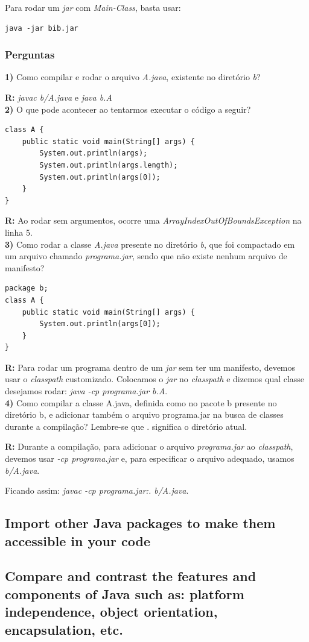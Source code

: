 \documentclass[12pt]{article}
\begin{document}
Para rodar um \textit{jar} com \textit{Main-Class}, basta usar:

\begin{lstlisting}
java -jar bib.jar
\end{lstlisting}

\subsubsection{Perguntas}

\textbf{1)} Como compilar e rodar o arquivo \textit{A.java}, existente no diretório \textit{b}?

\textbf{R:} \textit{javac b/A.java} e \textit{java b.A}
\\

\textbf{2)} O que pode acontecer ao tentarmos executar o código a seguir?

\begin{lstlisting}
class A {
	public static void main(String[] args) {
		System.out.println(args);
		System.out.println(args.length);
		System.out.println(args[0]);
	}
}
\end{lstlisting}

\textbf{R:} Ao rodar sem argumentos, ocorre uma \textit{ArrayIndexOutOfBoundsException} na linha 5.
\\

\textbf{3)} Como rodar a classe \textit{A.java} presente no diretório \textit{b}, que foi compactado em um arquivo chamado \textit{programa.jar}, sendo que não existe nenhum arquivo de manifesto?

\begin{lstlisting}
package b;
class A {
	public static void main(String[] args) {
		System.out.println(args[0]);
	}
}
\end{lstlisting}

\textbf{R:} Para rodar um programa dentro de um \textit{jar} sem ter um manifesto, devemos usar o \textit{classpath} customizado. Colocamos o \textit{jar} no \textit{classpath} e dizemos qual classe desejamos rodar: \textit{java -cp programa.jar b.A}.
\\

\textbf{4)} Como compilar a classe A.java, definida como no pacote b presente no diretório b, e adicionar também o arquivo programa.jar na busca de classes durante a compilação? Lembre-se que . significa o diretório atual.

\textbf{R:} Durante a compilação, para adicionar o arquivo \textit{programa.jar} ao \textit{classpath}, devemos usar \textit{-cp programa.jar} e, para especificar o arquivo adequado, usamos \textit{b/A.java}.

Ficando assim: \textit{javac -cp programa.jar:. b/A.java}.
\\



\pagebreak
\subsection{Import other Java packages to make them accessible in your code}

\subsection{Compare and contrast the features and components of Java such as: platform independence, object orientation, encapsulation, etc.}

	
\end{document}
